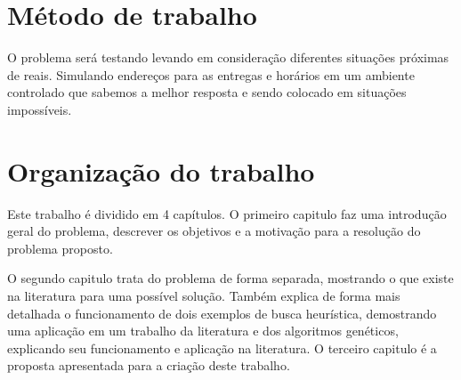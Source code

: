 \section{Método de trabalho}
O problema será testando levando em consideração diferentes situações próximas de reais.
Simulando endereços para as entregas e horários em um  ambiente controlado que sabemos a melhor resposta e sendo colocado em situações impossíveis. 

\section{Organização do trabalho}
Este trabalho é dividido em 4 capítulos. O primeiro capitulo faz uma introdução geral do problema, descrever os objetivos e a motivação para a resolução do problema proposto.

O segundo capitulo trata do problema de forma separada, mostrando o que existe na literatura para uma possível solução. Também explica de forma mais detalhada o funcionamento de dois exemplos de busca heurística, demostrando uma aplicação em um trabalho da literatura e dos algoritmos genéticos, explicando seu funcionamento e aplicação na literatura.
O terceiro capitulo é a proposta apresentada para a criação deste trabalho.

